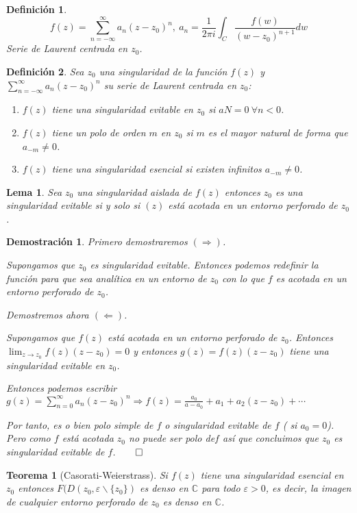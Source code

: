 \documentclass[12pt]{book}
\newtheorem{defi}{Definición}[chapter]
\newtheorem{theorem}{Teorema}[chapter]
\newtheorem*{dem}{Demostración}
\newtheorem{lema}{Lema}[chapter]
\newcommand{\C}{\mathbb{C}}
\begin{document}
\begin{defi}
$$f(z) = \sum_{n= -\infty}^{\infty} a_n (z-z_0)^n,\ a_n = \frac{1}{2\pi i} \int_C \frac{f(w)}{(w-z_0)^{n+1}}dw$$
Serie de Laurent centrada en $z_0$.
\end{defi}

\begin{defi}
Sea $z_0$ una singularidad de la función $f(z)$ y $\sum_{n= -\infty}^{\infty} a_n (z-z_0)^n$ su serie de Laurent centrada en $z_0$:
\begin{enumerate}
\item $f(z)$ tiene una singularidad evitable en $z_0$ si $aN=0\ \forall n<0$.
\item $f(z)$ tiene un polo de orden $m$ en $z_0$ si $m$ es el mayor natural de forma que $a_{-m}\neq 0$.
\item $f(z)$ tiene una singularidad esencial si existen infinitos $a_{-m}\neq 0$. 
\end{enumerate}
\end{defi}

\begin{lema}
Sea $z_0$ una singularidad aislada de $f(z)$ entonces $z_0$ es una singularidad evitable si y solo si $(z)$ está acotada en un entorno perforado de $z_0$.
\end{lema}

\begin{dem}
Primero demostraremos $(\Rightarrow)$.

Supongamos que $z_0$ es singularidad evitable. Entonces podemos redefinir la función para que sea analítica en un entorno de $z_0$ con lo que $f$ es acotada en un entorno perforado de $z_0$.

Demostremos ahora $(\Leftarrow)$.

Supongamos que $f(z)$ está acotada en un entorno perforado de $z_0$. Entonces $\lim_{z\to z_0} f(z)(z-z_0) =0$ y entonces $g(z) = f(z)(z-z_0)$ tiene una singularidad evitable en $z_0$.

Entonces podemos escribir $g(z) = \sum_{n=0}^\infty a_n (z-z_0)^n \Rightarrow f(z) = \frac{a_0}{a-a_0} + a_1 + a_2(z-z_0)+\cdots$

Por tanto, es o bien polo simple de $f$ o singularidad evitable de $f$ ( si $a_0=0$). Pero como $f$ está acotada $z_0$ no puede ser polo de$f$ así que concluimos que $z_0$ es singularidad evitable de $f$.$\qed$
\end{dem}


\begin{theorem}[Casorati-Weierstrass]
Si $f(z)$ tiene una singularidad esencial en $z_0$ entonces $F(D(z_0,\varepsilon\backslash\{z_0\})$ es denso en $\C$ para  todo $\varepsilon>0$, es decir, la imagen de cualquier entorno perforado de $z_0$ es denso en $\C$.
\end{theorem}
\end{document}
